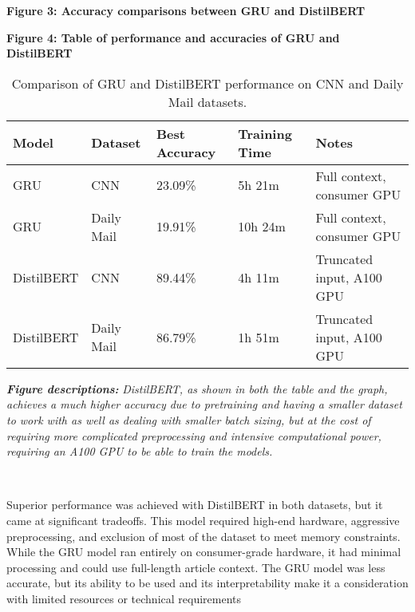 \documentclass[11pt]{article}
\begin{document}
    \begin{samepage}
    \begin{center}
		\textbf{Figure 3: Accuracy comparisons between GRU and DistilBERT}
    \end{center}

	\begin{center}
		\textbf{Figure 4: Table of performance and accuracies of GRU and DistilBERT}
	\end{center}
	\begin{table}[h]
\begin{scriptsize}
\begin{tabularx}{\textwidth}{l l l l l}
\textbf{Model} & \textbf{Dataset} & \textbf{Best Accuracy} & \textbf{Training Time} & \textbf{Notes} \\
\hline
GRU & CNN & 23.09\% & 5h 21m & Full context, consumer GPU \\
GRU & Daily Mail & 19.91\% & 10h 24m & Full context, consumer GPU \\
DistilBERT & CNN & 89.44\% & 4h 11m & Truncated input, A100 GPU \\
DistilBERT & Daily Mail & 86.79\% & 1h 51m & Truncated input, A100 GPU \\
\end{tabularx}
\end{scriptsize}
\caption{Comparison of GRU and DistilBERT performance on CNN and Daily Mail datasets.}
\end{table}
\vspace{1em}
\noindent\begin{minipage}{0.9\linewidth}
\begin{scriptsize}
\textbf{\textit{Figure descriptions:}} \textit{DistilBERT, as shown in both the table and the graph, achieves a much higher accuracy due to pretraining and having a smaller dataset to work with as well as dealing with smaller batch sizing, but at the cost of requiring more complicated preprocessing and intensive computational power, requiring an A100 GPU to be able to train the models.}
\end{scriptsize}
\end{minipage}
\end{samepage}
{ \hspace*{\fill} \\}

\begin{samepage}
    Superior performance was achieved with DistilBERT in both datasets, but
it came at significant tradeoffs. This model required high-end hardware,
aggressive preprocessing, and exclusion of most of the dataset to meet
memory constraints. While the GRU model ran entirely on consumer-grade
hardware, it had minimal processing and could use full-length article
context. The GRU model was less accurate, but its ability to be used and
its interpretability make it a consideration with limited resources or
technical requirements
\end{samepage}
\end{document}
